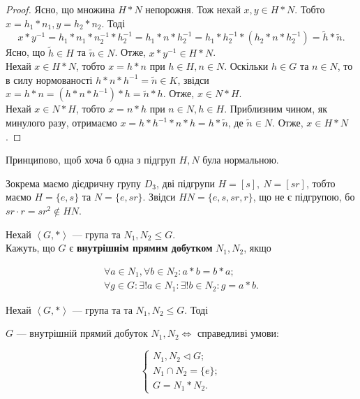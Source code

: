 \documentclass{math_library}
\begin{document}
\begin{proof}
Ясно, що множина $H*N$ непорожня. Тож нехай $x,y \in H*N$. Тобто $x = h_1*n_1, y = h_2*n_2$. Тоді \[
x*y^{-1} = h_1*n_1*n_2^{-1}*h_2^{-1} = h_1*n*h_2^{-1} = h_1*h_2^{-1} *(h_2*n*h_2^{-1})= \tilde{h}*\tilde{n}.
\]
Ясно, що $\tilde{h} \in H$ та $\tilde{n} \in N$. Отже, $x*y^{-1} \in H*N$.
\bigskip \\
Нехай $x \in H*N$, тобто $x = h*n$ при $h \in H, n \in N$. Оскільки $h \in G$ та $n \in N$, то в силу нормованості $h*n*h^{-1} = \tilde{n} \in K$, звідси $x = h*n = (h*n*h^{-1})*h = \tilde{n}*h$. Отже, $x \in N*H$.\\
Нехай $x \in N*H$, тобто $x = n*h$ при $n \in N, h \in H$. Приблизним чином, як минулого разу, отримаємо $x = h*h^{-1}*n*h = h*\tilde{n}$, де $\tilde{n} \in N$. Отже, $x \in H*N$.
\end{proof}

\begin{remark}
Принципово, щоб хоча б одна з підгруп $H,N$ була нормальною.
\end{remark}

\begin{example}
Зокрема маємо дієдричну групу $D_3$, дві підгрупи $H = [s],\ N =[sr]$, тобто маємо $H = \{e,s\}$ та $N = \{e, sr\}$. Звідси $HN = \{e,s,sr,r\}$, що не є підгрупою, бо $sr \cdot r = sr^2 \notin HN$.
\end{example}

\begin{definition}
Нехай $\left<G, *\right>$ --- група та $N_1,N_2 \leq G$.\\
Кажуть, що $G$ є \textbf{внутрішнім прямим добутком} $N_1,N_2$, якщо

\begin{align*}
\forall a \in N_1, \forall b \in N_2: a*b = b*a; \\
\forall g \in G: \exists !a \in N_1: \exists !b \in N_2: g = a*b.
\end{align*}
\end{definition}

\begin{theorem}
Нехай $\left<G, *\right>$  --- група та та $N_1,N_2 \leq G$. Тоді
\begin{center}
$G$ --- внутрішній прямий добуток $N_1,N_2 \iff$ справедливі умови:
\end{center}
\begin{equation*}
\label{internal_product}
\begin{cases} N_1, N_2 \triangleleft G; \\ N_1 \cap N_2 = \{e\}; \\ G = N_1*N_2.
\end{cases}
\end{equation*}
\end{theorem}
\end{document}
